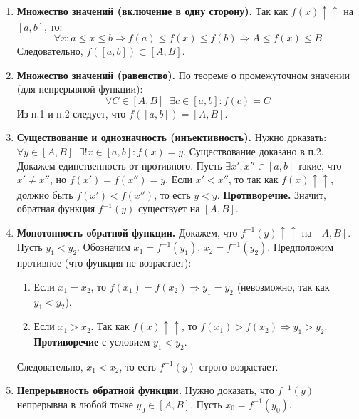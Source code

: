 \begin{tcolorbox}[title=Доказательство]
    \begin{enumerate}
        \item \textbf{Множество значений (включение в одну сторону).}
        Так как $f(x) \uparrow\uparrow$ на $[a, b]$, то:
        \[ \forall x: a \le x \le b \Rightarrow f(a) \le f(x) \le f(b) \Rightarrow A \le f(x) \le B \]
        Следовательно, $f([a, b]) \subset [A, B]$.

        \item \textbf{Множество значений (равенство).}
        По теореме о промежуточном значении (для непрерывной функции):
        \[ \forall C \in [A, B] \;\; \exists c \in [a, b]: f(c) = C \]
        Из п.1 и п.2 следует, что $f([a, b]) = [A, B]$.

        \item \textbf{Существование и однозначность (инъективность).}
        Нужно доказать: $\forall y \in [A, B] \;\; \exists! x \in [a, b]: f(x) = y$.
        Существование доказано в п.2. Докажем единственность от противного.
        Пусть $\exists x', x'' \in [a, b]$ такие, что $x' \neq x''$, но $f(x') = f(x'') = y$.
        Если $x' < x''$, то так как $f(x) \uparrow\uparrow$, должно быть $f(x') < f(x'')$, то есть $y < y$.
        \textbf{Противоречие.} Значит, обратная функция $f^{-1}(y)$ существует на $[A, B]$.

        \item \textbf{Монотонность обратной функции.}
        Докажем, что $f^{-1}(y) \uparrow\uparrow$ на $[A, B]$.
        Пусть $y_1 < y_2$. Обозначим $x_1 = f^{-1}(y_1)$, $x_2 = f^{-1}(y_2)$.
        Предположим противное (что функция не возрастает):
        \begin{enumerate}
            \item Если $x_1 = x_2$, то $f(x_1) = f(x_2) \Rightarrow y_1 = y_2$ (невозможно, так как $y_1 < y_2$).
            \item Если $x_1 > x_2$. Так как $f(x) \uparrow\uparrow$, то $f(x_1) > f(x_2) \Rightarrow y_1 > y_2$.
            \textbf{Противоречие} с условием $y_1 < y_2$.
        \end{enumerate}
        Следовательно, $x_1 < x_2$, то есть $f^{-1}(y)$ строго возрастает.

        \item \textbf{Непрерывность обратной функции.}
        Нужно доказать, что $f^{-1}(y)$ непрерывна в любой точке $y_0 \in [A, B]$.
        Пусть $x_0 = f^{-1}(y_0)$.


\end{enumerate}
\end{tcolorbox}
